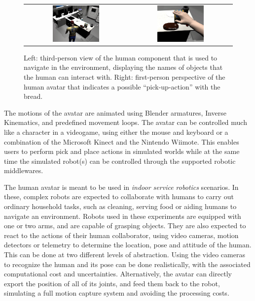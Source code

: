 \documentclass{llncs}
\begin{document}
\begin{figure}[ht!]
\centering
\begin{tabular}{cc}
 \includegraphics[width=0.475\textwidth]{pics/human_control_1.png} &
 \includegraphics[width=0.475\textwidth]{pics/human_control_2.png}
\end{tabular}
\caption{Left: third-person view of the human component that is used to
    navigate in the environment, displaying the names of objects that the human
    can interact with. Right: first-person perspective of the human avatar that
    indicates a possible ``pick-up-action'' with the bread.}
\label{fig:human_control}
\end{figure}

The motions of the avatar are animated using Blender %
armatures, Inverse Kinematics, and predefined movement loops.
The avatar can be controlled much like a character in a videogame, using either
the mouse and keyboard or a combination of the Microsoft Kinect and the
Nintendo Wiimote. This enables users to perform
pick and place actions in simulated worlds while at the same time the
simulated robot(s) can be controlled through the supported robotic middlewares.


The human avatar is meant to be used in \emph{indoor service robotics} scenarios.
In these, complex robots are expected to collaborate with humans to carry out
ordinary household tasks, such as cleaning, serving food or aiding humans to
navigate an environment.
Robots used in these experiments are equipped with one or two arms, and are
capable of grasping objects. They are also expected to react to the actions of
their human collaborator, using video cameras, motion detectors or telemetry to
determine the location, pose and attitude of the human.
This can be done at two different levels of
abstraction. Using the video cameras to recognize the human and its pose can be
done realistically, with the associated computational cost and uncertainties.
Alternatively, the avatar can directly export the position of all of its
joints, and feed them back to the robot, simulating a full motion capture
system and avoiding the processing costs.
\end{document}
